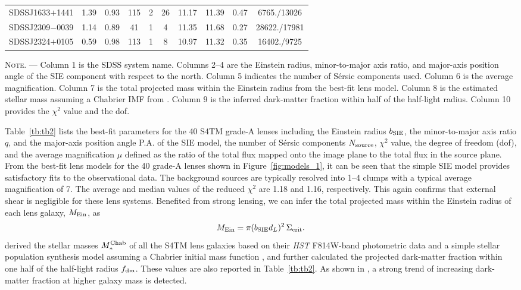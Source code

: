 \documentclass{emulateapj}
\begin{document}
\begin{table*}[htbp]
\begin{center}
\begin{tabular}{c c c c c c c c c c}
SDSSJ1633$+$1441 & 1.39 & 0.93 & 115 & 2 & 26 & 11.17 & 11.39 & 0.47 & 6765./13026 \\ 
SDSSJ2309$-$0039 & 1.14 & 0.89 & 41 & 1 & 4 & 11.35 & 11.68 & 0.27 & 28622./17981 \\ 
SDSSJ2324$+$0105 & 0.59 & 0.98 & 113 & 1 & 8 & 10.97 & 11.32 & 0.35 & 16402./9725 \\ 
\hline \hline
\end{tabular}
\end{center}
\textsc{      Note.} --- Column 1 is the SDSS system name. Columns 2--4 are the Einstein radius, minor-to-major axis ratio, and major-axis position angle of the SIE component with respect to the north. Column 5 indicates the number of S\'{e}rsic components used. Column 6 is the average magnification. Column 7 is the total projected mass within the Einstein radius from the best-fit lens model. Column 8 is the estimated stellar mass assuming a Chabrier IMF from \citet{Shu15}. Column 9 is the inferred dark-matter fraction within half of the half-light radius. Column 10 provides the $\chi^2$ value and the dof. \\
\end{table*}

Table~\ref{tb:tb2} lists the best-fit parameters for the 40 S4TM grade-A lenses including 
the Einstein radius $b_{\rm SIE}$, the minor-to-major axis ratio $q$, and the major-axis 
position angle P.A. of the SIE model, the number of S\'{e}rsic components $N_{\rm source}$, 
$\chi^2$ value, the degree of freedom (dof), and the average magnification $\mu$ defined 
as the ratio of the total flux mapped onto the image plane to the total flux in the 
source plane. From the best-fit lens models for the 40 grade-A lenses shown in 
Figure~\ref{fig:models_1}, it can be seen that the simple SIE model provides satisfactory
fits to the observational data. The background sources are typically resolved into 1--4 
clumps with a typical average magnification of 7. 
The average and median values of the reduced $\chi^2$ are 1.18 and 1.16, respectively. 
This again confirms that external shear is negligible for these lens systems. 
Benefited from strong lensing, we can infer the total projected mass within the 
Einstein radius of each lens galaxy, $M_{\rm Ein}$, as 
\begin{equation}
M_{\rm Ein} = \pi (b_{\rm SIE} d_L)^2 \, \Sigma_{\rm crit}. 
\end{equation}
\citet{Shu15} derived the stellar masses $M_*^{\rm Chab}$ of all the S4TM lens galaxies 
based on their \textsl{HST} F814W-band photometric data and a simple stellar population 
synthesis model assuming a Chabrier initial mass function \citep[IMF;][]{Chabrier03}, and 
further calculated the projected dark-matter fraction within one half of the 
half-light radius $f_{\rm dm}$. These values are also reported in Table~\ref{tb:tb2}. 
As shown in \citet{Shu15}, a strong trend of increasing dark-matter fraction at higher 
galaxy mass is detected. 
\end{document}
